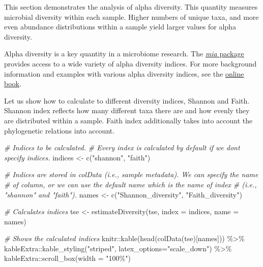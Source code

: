 \documentclass[
  oneside]{book}
\newenvironment{Shaded}{\begin{snugshade}}{\end{snugshade}}
\newcommand{\AttributeTok}[1]{\textcolor[rgb]{0.77,0.63,0.00}{#1}}
\newcommand{\CommentTok}[1]{\textcolor[rgb]{0.56,0.35,0.01}{\textit{#1}}}
\newcommand{\FunctionTok}[1]{\textcolor[rgb]{0.00,0.00,0.00}{#1}}
\newcommand{\NormalTok}[1]{#1}
\newcommand{\OtherTok}[1]{\textcolor[rgb]{0.56,0.35,0.01}{#1}}
\newcommand{\SpecialCharTok}[1]{\textcolor[rgb]{0.00,0.00,0.00}{#1}}
\newcommand{\StringTok}[1]{\textcolor[rgb]{0.31,0.60,0.02}{#1}}
\begin{document}
This section demonstrates the analysis of alpha diversity. This
quantity measures microbial diversity within each sample. Higher
numbers of unique taxa, and more even abundance distributions within a
sample yield larger values for alpha diversity.

Alpha diversity is a key quantity in a microbiome research. The \href{https://microbiome.github.io/mia/}{\emph{mia}
package} provides access to a wide
variety of alpha diversity indices. For more background information
and examples with various alpha diversity indices, see the \href{https://microbiome.github.io/OMA/microbiome-diversity.html\#alpha-diversity}{online
book}.

Let us show how to calculate to different diversity indices, Shannon
and Faith. Shannon index reflects how many different taxa there are
and how evenly they are distributed within a sample. Faith index
additionally takes into account the phylogenetic relations into
account.

\begin{Shaded}
\begin{Highlighting}[]
\CommentTok{\# Indices to be calculated. }
\CommentTok{\# Every index is calculated by default if we don\textquotesingle{}t specify indices.}
\NormalTok{indices }\OtherTok{\textless{}{-}} \FunctionTok{c}\NormalTok{(}\StringTok{"shannon"}\NormalTok{, }\StringTok{"faith"}\NormalTok{)}

\CommentTok{\# Indices are stored in colData (i.e., sample metadata). We can specify the name}
\CommentTok{\# of column, or we can use the default name which is the name of index }
\CommentTok{\# (i.e., "shannon" and "faith"). }
\NormalTok{names }\OtherTok{\textless{}{-}} \FunctionTok{c}\NormalTok{(}\StringTok{"Shannon\_diversity"}\NormalTok{, }\StringTok{"Faith\_diversity"}\NormalTok{)}

\CommentTok{\# Calculates indices}
\NormalTok{tse }\OtherTok{\textless{}{-}} \FunctionTok{estimateDiversity}\NormalTok{(tse, }\AttributeTok{index =}\NormalTok{ indices, }\AttributeTok{name =}\NormalTok{ names)}

\CommentTok{\# Shows the calculated indices}
\NormalTok{knitr}\SpecialCharTok{::}\FunctionTok{kable}\NormalTok{(}\FunctionTok{head}\NormalTok{(}\FunctionTok{colData}\NormalTok{(tse)[names])) }\SpecialCharTok{\%\textgreater{}\%} 
\NormalTok{  kableExtra}\SpecialCharTok{::}\FunctionTok{kable\_styling}\NormalTok{(}\StringTok{"striped"}\NormalTok{, }
                            \AttributeTok{latex\_options=}\StringTok{"scale\_down"}\NormalTok{) }\SpecialCharTok{\%\textgreater{}\%} 
\NormalTok{  kableExtra}\SpecialCharTok{::}\FunctionTok{scroll\_box}\NormalTok{(}\AttributeTok{width =} \StringTok{"100\%"}\NormalTok{)}
\end{Highlighting}
\end{Shaded}
\end{document}

